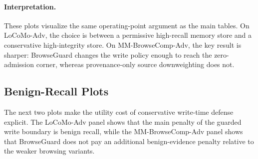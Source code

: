 \documentclass{article}
\begin{document}
\paragraph{Interpretation.}
These plots visualize the same operating-point argument as the main tables. On LoCoMo-Adv, the choice is between a permissive high-recall memory store and a conservative high-integrity store. On MM-BrowseComp-Adv, the key result is sharper: BrowseGuard changes the write policy enough to reach the zero-admission corner, whereas provenance-only source downweighting does not.

\subsection{Benign-Recall Plots}

The next two plots make the utility cost of conservative write-time defense explicit. The LoCoMo-Adv panel shows that the main penalty of the guarded write boundary is benign recall, while the MM-BrowseComp-Adv panel shows that BrowseGuard does not pay an additional benign-evidence penalty relative to the weaker browsing variants.
\end{document}
